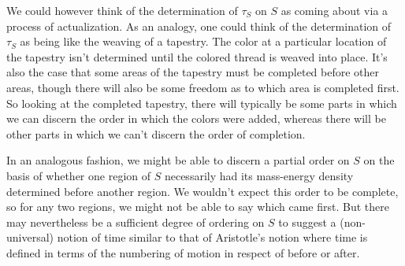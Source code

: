 We could however think of the determination of $\tau_S$ on $S$ as coming about via a process of actualization. As an analogy, one could think of the determination of $\tau_S$ as being like the weaving of a tapestry. The color at a particular location of the tapestry isn't determined until the colored thread is weaved into place. It's also the case that some areas of the tapestry must be completed before other areas, though there will also be some freedom as to which area is completed first. So looking at the completed tapestry, there will typically be some parts in which we can discern the order in which the colors were added, whereas there will be other parts in which we can't discern the order of completion. 

In an analogous fashion, we might be able to discern a partial order on $S$ on the basis of whether one region of $S$ necessarily had its mass-energy density determined before another region. We wouldn't expect this order to be complete, so for any two regions, we might not be able to say which came first. But there may nevertheless be a sufficient degree of ordering on $S$ to suggest a (non-universal) notion of time similar to that of Aristotle's notion where time is defined in terms of the numbering of motion in respect of before or after. 

